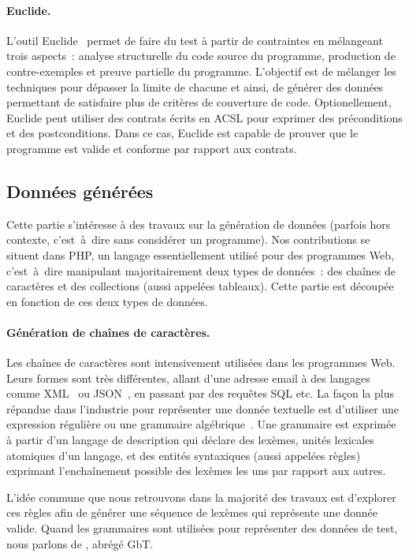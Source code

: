 \paragraph{Euclide.} L'outil Euclide~ permet de faire du test à
partir de contrain\-tes en mélangeant trois aspects~: analyse structurelle du
code source du programme, production de contre-exemples et preuve partielle du
programme. L'objectif est de mélanger les techniques pour dépasser la limite de
chacune et ainsi, de générer des données permettant de satisfaire plus de
critères de couverture de code. Optionellement, Euclide peut utiliser des
contrats écrits en ACSL pour exprimer des préconditions et des postconditions.
Dans ce cas, Euclide est capable de prouver que le programme est valide et
conforme par rapport aux contrats.

\subsection{Données générées}

Cette partie s'intéresse à des travaux sur la génération de données (parfois
hors contexte, c'est~à~dire sans considérer un programme). Nos contributions se
situent dans PHP, un langage essentiellement utilisé pour des programmes Web,
c'est~à~dire manipulant majoritairement deux types de données~: des chaînes de
caractères et des collections (aussi appelées tableaux). Cette partie est
découpée en fonction de ces deux types de données.

\paragraph{Génération de chaînes de caractères.} Les chaînes de caractères sont
intensivement utilisées dans les programmes Web. Leurs formes sont très
différentes, allant d'une adresse email à des langages comme XML~ ou
JSON~, en passant par des requêtes SQL etc. La façon la plus
répandue dans l'industrie pour représenter une donnée textuelle est d'utiliser
une expression régulière ou une grammaire algébrique~. Une
grammaire est exprimée à partir d'un langage de description qui déclare des
lexèmes, unités lexicales atomiques d'un langage, et des entités syntaxiques
(aussi appelées règles) exprimant l'enchaînement possible des lexèmes les uns
par rapport aux autres.

L'idée commune que nous retrouvons dans la majorité des travaux est d'explorer
ces règles afin de générer une séquence de lexèmes qui représente une donnée
valide. Quand les grammaires sont utilisées pour représenter des données de
test, nous parlons de , abrégé GbT.

